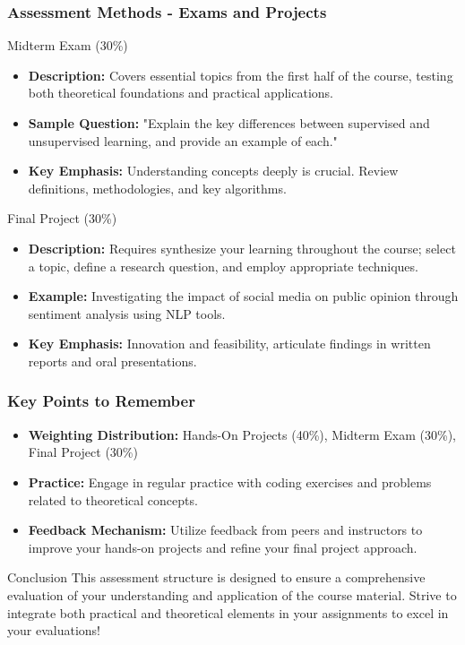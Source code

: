 \documentclass[aspectratio=169]{beamer}
\begin{document}
\begin{frame}[fragile]
    \frametitle{Assessment Methods - Exams and Projects}
    \begin{block}{Midterm Exam (30\%)}
        \begin{itemize}
            \item \textbf{Description:} Covers essential topics from the first half of the course, testing both theoretical foundations and practical applications.
            \item \textbf{Sample Question:} "Explain the key differences between supervised and unsupervised learning, and provide an example of each."
            \item \textbf{Key Emphasis:} Understanding concepts deeply is crucial. Review definitions, methodologies, and key algorithms.
        \end{itemize}
    \end{block}
    
    \begin{block}{Final Project (30\%)}
        \begin{itemize}
            \item \textbf{Description:} Requires synthesize your learning throughout the course; select a topic, define a research question, and employ appropriate techniques.
            \item \textbf{Example:} Investigating the impact of social media on public opinion through sentiment analysis using NLP tools.
            \item \textbf{Key Emphasis:} Innovation and feasibility, articulate findings in written reports and oral presentations.
        \end{itemize}
    \end{block}
\end{frame}

\begin{frame}[fragile]
    \frametitle{Key Points to Remember}
    \begin{itemize}
        \item \textbf{Weighting Distribution:} Hands-On Projects (40\%), Midterm Exam (30\%), Final Project (30\%)
        \item \textbf{Practice:} Engage in regular practice with coding exercises and problems related to theoretical concepts.
        \item \textbf{Feedback Mechanism:} Utilize feedback from peers and instructors to improve your hands-on projects and refine your final project approach.
    \end{itemize}
    \begin{block}{Conclusion}
        This assessment structure is designed to ensure a comprehensive evaluation of your understanding and application of the course material. Strive to integrate both practical and theoretical elements in your assignments to excel in your evaluations!
    \end{block}
\end{frame}
\end{document}
